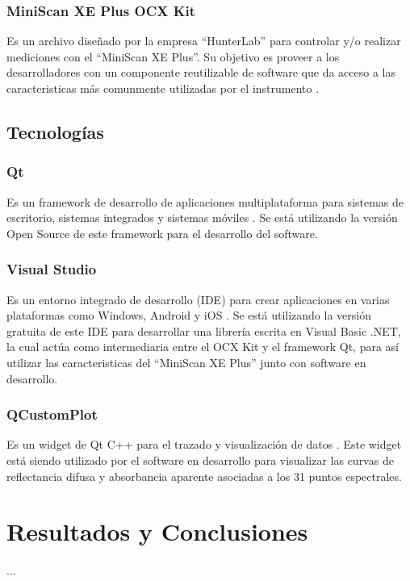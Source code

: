 \documentclass[conference]{IEEEtran}
\begin{document}
		\subsubsection{MiniScan XE Plus OCX Kit}
			Es un archivo dise\~{n}ado por la empresa ``HunterLab'' para controlar y/o realizar mediciones con el ``MiniScan XE Plus''. Su objetivo es proveer a los desarrolladores con un componente reutilizable de software que da acceso a las caracteristicas m\'{a}s comunmente utilizadas por el instrumento \cite{MiniScanXEPlus-manual}.		
	
	\subsection{Tecnolog\'{i}as}
		\subsubsection{Qt}
			Es un framework de desarrollo de aplicaciones multiplataforma para sistemas de escritorio, sistemas integrados y sistemas m\'{o}viles \cite{Qt}. Se est\'{a} utilizando la versi\'{o}n Open Source de este framework para el desarrollo del software.
			
		\subsubsection{Visual Studio}
			Es un entorno integrado de desarrollo (IDE) para crear aplicaciones en varias plataformas como Windows, Android y iOS \cite{VS}. Se est\'{a} utilizando la versi\'{o}n gratuita de este IDE para desarrollar una librer\'{i}a escrita en Visual Basic .NET, la cual act\'{u}a como intermediaria entre el OCX Kit y el framework Qt, para as\'{i} utilizar las caracteristicas del ``MiniScan XE Plus'' junto con software en desarrollo.

		\subsubsection{QCustomPlot}
			Es un widget de Qt C++ para el trazado y visualizaci\'{o}n de datos \cite{QCustomPlot}. Este widget est\'{a} siendo utilizado por el software en desarrollo para visualizar las curvas de reflectancia difusa y absorbancia aparente asociadas a los 31 puntos espectrales.

\section{Resultados y Conclusiones}
...
\end{document}
